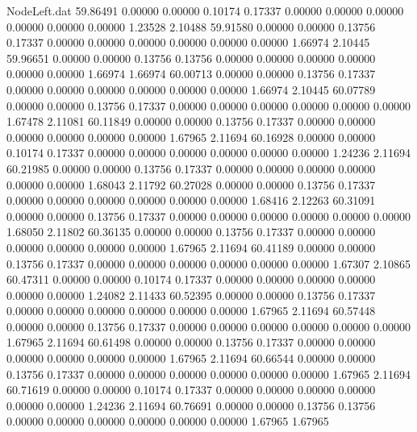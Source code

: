 \begin{filecontents}{NodeLeft.dat}
  59.86491    0.00000    0.00000     0.10174    0.17337    0.00000    0.00000    0.00000    0.00000    0.00000    0.00000    1.23528    2.10488
  59.91580    0.00000    0.00000     0.13756    0.17337    0.00000    0.00000    0.00000    0.00000    0.00000    0.00000    1.66974    2.10445
  59.96651    0.00000    0.00000     0.13756    0.13756    0.00000    0.00000    0.00000    0.00000    0.00000    0.00000    1.66974    1.66974
  60.00713    0.00000    0.00000     0.13756    0.17337    0.00000    0.00000    0.00000    0.00000    0.00000    0.00000    1.66974    2.10445
  60.07789    0.00000    0.00000     0.13756    0.17337    0.00000    0.00000    0.00000    0.00000    0.00000    0.00000    1.67478    2.11081
  60.11849    0.00000    0.00000     0.13756    0.17337    0.00000    0.00000    0.00000    0.00000    0.00000    0.00000    1.67965    2.11694
  60.16928    0.00000    0.00000     0.10174    0.17337    0.00000    0.00000    0.00000    0.00000    0.00000    0.00000    1.24236    2.11694
  60.21985    0.00000    0.00000     0.13756    0.17337    0.00000    0.00000    0.00000    0.00000    0.00000    0.00000    1.68043    2.11792
  60.27028    0.00000    0.00000     0.13756    0.17337    0.00000    0.00000    0.00000    0.00000    0.00000    0.00000    1.68416    2.12263
  60.31091    0.00000    0.00000     0.13756    0.17337    0.00000    0.00000    0.00000    0.00000    0.00000    0.00000    1.68050    2.11802
  60.36135    0.00000    0.00000     0.13756    0.17337    0.00000    0.00000    0.00000    0.00000    0.00000    0.00000    1.67965    2.11694
  60.41189    0.00000    0.00000     0.13756    0.17337    0.00000    0.00000    0.00000    0.00000    0.00000    0.00000    1.67307    2.10865
  60.47311    0.00000    0.00000     0.10174    0.17337    0.00000    0.00000    0.00000    0.00000    0.00000    0.00000    1.24082    2.11433
  60.52395    0.00000    0.00000     0.13756    0.17337    0.00000    0.00000    0.00000    0.00000    0.00000    0.00000    1.67965    2.11694
  60.57448    0.00000    0.00000     0.13756    0.17337    0.00000    0.00000    0.00000    0.00000    0.00000    0.00000    1.67965    2.11694
  60.61498    0.00000    0.00000     0.13756    0.17337    0.00000    0.00000    0.00000    0.00000    0.00000    0.00000    1.67965    2.11694
  60.66544    0.00000    0.00000     0.13756    0.17337    0.00000    0.00000    0.00000    0.00000    0.00000    0.00000    1.67965    2.11694
  60.71619    0.00000    0.00000     0.10174    0.17337    0.00000    0.00000    0.00000    0.00000    0.00000    0.00000    1.24236    2.11694
  60.76691    0.00000    0.00000     0.13756    0.13756    0.00000    0.00000    0.00000    0.00000    0.00000    0.00000    1.67965    1.67965

\end{filecontents}
